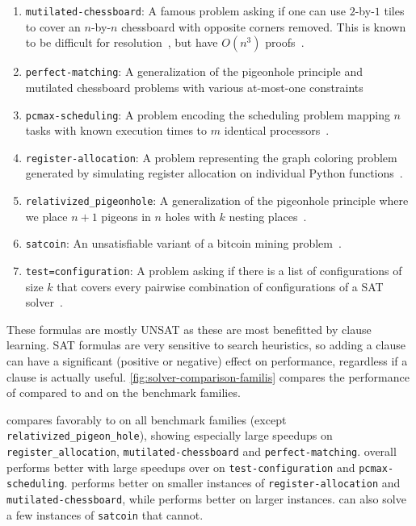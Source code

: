 \begin{enumerate}
    \item \texttt{mutilated-chessboard}: A famous problem asking if one can use
    $2$-by-$1$ tiles to cover an $n$-by-$n$ chessboard with opposite corners
    removed. This is known to be difficult for
    resolution~\cite{chessboard-resolution}, but have $O(n^3)$ \pr
    proofs~\cite{mutilatedchessboard-pr}.
    \item \texttt{perfect-matching}: A generalization of the pigeonhole
    principle and mutilated chessboard problems with various at-most-one
    constraints~\cite{bipartgen}
    \item \texttt{pcmax-scheduling}: A problem encoding the scheduling problem
    mapping $n$ tasks with known execution times to $m$ identical
    processors~\cite{pcmax}.
    \item \texttt{register-allocation}: A problem representing the graph
    coloring problem generated by simulating register allocation on individual
    Python functions~\cite{register-allocation}.
    \item \texttt{relativized\_pigeonhole}: A generalization of the pigeonhole
    principle where we place $n+1$ pigeons in $n$ holes with $k$ nesting
    places~\cite{relativized-pigeonhole}.
    \item \texttt{satcoin}: An unsatisfiable variant of a bitcoin mining
    problem~\cite{satcoin}.
    \item \texttt{test=configuration}: A problem asking if there is a list of
    configurations of size $k$ that covers every pairwise combination of
    configurations of a SAT solver~\cite{test-configuration}.
\end{enumerate}

These formulas are mostly UNSAT as these are most benefitted by \pr clause
learning. SAT formulas are very sensitive to search heuristics, so adding a \pr
clause can have a significant (positive or negative) effect on performance,
regardless if a clause is actually useful.
\autoref{fig:solver-comparison-familis} compares the performance of \tool
compared to \cadical and \prelearn on the benchmark families. 

\tool compares favorably to \cadical on all benchmark families (except
\texttt{relativized\_pigeon\_hole}), showing especially large speedups on
\texttt{register\_allocation}, \texttt{mutilated-chessboard} and
\texttt{perfect-matching}. \prelearn overall performs better with large speedups
over \tool on \texttt{test-configuration} and \texttt{pcmax-scheduling}. \tool
performs better on smaller instances of \texttt{register-allocation} and
\texttt{mutilated-chessboard}, while \prelearn performs better on larger
instances. \tool can also solve a few instances of \texttt{satcoin} that
\prelearn cannot.


